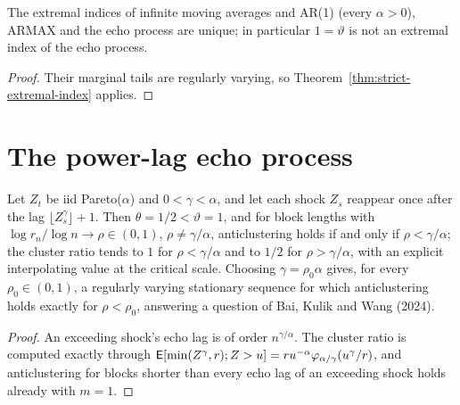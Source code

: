 \begin{corollary}
  \label{cor:strict-all}
  \leanok
  The extremal indices of infinite moving averages and AR(1) (every $\alpha > 0$), ARMAX and the echo process are
  unique; in particular $1 = \vartheta$ is not an extremal index of the echo process.
\end{corollary}
\begin{proof}
  \leanok
  Their marginal tails are regularly varying, so Theorem~\ref{thm:strict-extremal-index} applies.
\end{proof}

\section{The power-lag echo process}

\begin{theorem}
  \label{thm:power-lag-echo}
  \leanok
  Let $Z_t$ be iid Pareto($\alpha$) and $0 < \gamma < \alpha$, and let each shock $Z_s$ reappear once after the lag
  $\lfloor Z_s^\gamma \rfloor + 1$. Then $\theta = 1/2 < \vartheta = 1$, and for block lengths with $\log r_n/\log n \to \rho \in (0,1)$,
  $\rho \ne \gamma/\alpha$, anticlustering holds if and only if $\rho < \gamma/\alpha$; the cluster ratio tends to $1$ for
  $\rho < \gamma/\alpha$ and to $1/2$ for $\rho > \gamma/\alpha$, with an explicit interpolating value at the critical scale.
  Choosing $\gamma = \rho_0 \alpha$ gives, for every $\rho_0 \in (0,1)$, a regularly varying stationary sequence for which
  anticlustering holds exactly for $\rho < \rho_0$, answering a question of Bai, Kulik and Wang (2024).
\end{theorem}
\begin{proof}
  \leanok
  An exceeding shock's echo lag is of order $n^{\gamma/\alpha}$. The cluster ratio is computed exactly through
  $\mathsf{E}[\min(Z^\gamma, r); Z > u] = r u^{-\alpha} \varphi_{\alpha/\gamma}(u^\gamma/r)$, and anticlustering for blocks shorter than every echo lag of
  an exceeding shock holds already with $m = 1$.
\end{proof}

